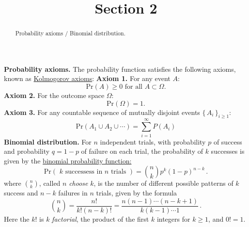 \documentclass{ximera}
\title{Section 2}
\begin{document}
\begin{abstract}
Probability axioms / Binomial distribution.
\end{abstract}
\maketitle

{\bf Probability axioms.} The probability function satisfies the following axioms, known as \href{http://en.wikipedia.org/wiki/Probability_axioms}{Kolmogorov axioms}:
\vspace{.35cm}
\newline
{\bf Axiom 1.} For any event $A$: 
\[ 
\text{Pr}(A)\geq 0 \text{ for all }A\subset \Omega .  
\]
{\bf Axiom 2.} For the outcome space $\Omega$:
\[ 
\text{Pr}(\Omega) = 1. 
\] 
{\bf Axiom 3.}  For any countable sequence of mutually disjoint events $\{\,A_{i}\,\}_{i\geq 1}$:
\[  
\text{Pr}(A_{1} \cup A_{2} \cup \cdots ) = \sum_{i=1}^{\infty} P(A_{i})
\] 
\vspace{1cm}
\newline
{\bf Binomial distribution.} For $n$ independent trials, with probability $p$ of success and probability $q=1-p$ of failure on each trial, the probability of $k$ successes is given by the \href{http://en.wikipedia.org/wiki/Binomial_distribution}{binomial probability function:} 
\[
\text{Pr}( \,\, k \text{ successess in } n \text{ trials }) = {n\choose k}p^{k}(1-p)^{n-k}\,.
\]
where ${n\choose k}$, called $n$ {\it choose} $k$, is the number of different possible patterns of $k$ success and $n-k$ failures in $n$ trials, given by the formula
\[
{n\choose k} = \frac{n!}{k!(n-k)!} = \frac{n(n-1)\cdots(n-k+1)}{k(k-1)\cdots 1}\,.
\]
Here the $k!$ is $k$ {\it factorial}, the product of the first $k$ integers for $k\geq 1$, and $0! = 1$.
\end{document}
